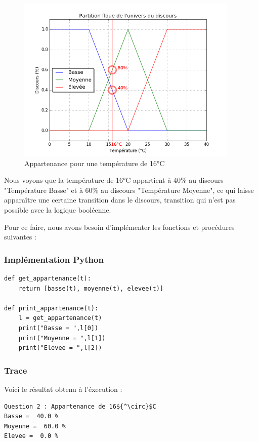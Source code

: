 \documentclass[a4paper]{article}
\begin{document}
\begin{figure}[h]
\begin{center}
	\includegraphics[width=400px]{plot_3_16dC.png}
\end{center}
\caption{Appartenance pour une température de 16°C}
\end{figure}

Nous voyons que la température de 16°C appartient à 40\% au discours "Température Basse" et à 60\% au discours "Température Moyenne", ce qui laisse apparaître une certaine transition dans le discours, transition qui n'est pas possible avec la logique booléenne.

Pour ce faire, nous avons besoin d'implémenter les fonctions et procédures suivantes :

\subsubsection{Implémentation Python}
\begin{lstlisting}
def get_appartenance(t):
    return [basse(t), moyenne(t), elevee(t)]

def print_appartenance(t):
    l = get_appartenance(t)
    print("Basse = ",l[0])
    print("Moyenne = ",l[1])
    print("Elevee = ",l[2])
\end{lstlisting}

\subsubsection{Trace}
Voici le résultat obtenu à l'éxecution :

\begin{lstlisting}[mathescape]
Question 2 : Appartenance de 16${^\circ}$C
Basse =  40.0 %
Moyenne =  60.0 %
Elevee =  0.0 %
\end{lstlisting}
\end{document}
